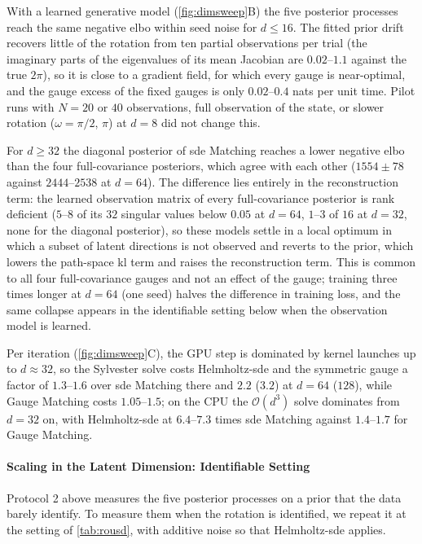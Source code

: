 \documentclass{article} %
\begin{document}
With a learned generative model (\cref{fig:dimsweep}B) the five posterior processes reach the same negative \gls{elbo} within seed noise for $d \le 16$. The fitted prior drift recovers little of the rotation from ten partial observations per trial (the imaginary parts of the eigenvalues of its mean Jacobian are $0.02$--$1.1$ against the true $2\pi$), so it is close to a gradient field, for which every gauge is near-optimal, and the gauge excess of the fixed gauges is only $0.02$--$0.4$ nats per unit time. Pilot runs with $N = 20$ or $40$ observations, full observation of the state, or slower rotation ($\omega = \pi/2$, $\pi$) at $d = 8$ did not change this.

For $d \ge 32$ the diagonal posterior of \gls{sde} Matching reaches a lower negative \gls{elbo} than the four full-covariance posteriors, which agree with each other ($1554 \pm 78$ against $2444$--$2538$ at $d = 64$). The difference lies entirely in the reconstruction term: the learned observation matrix of every full-covariance posterior is rank deficient ($5$--$8$ of its $32$ singular values below $0.05$ at $d = 64$, $1$--$3$ of $16$ at $d = 32$, none for the diagonal posterior), so these models settle in a local optimum in which a subset of latent directions is not observed and reverts to the prior, which lowers the path-space \gls{kl} term and raises the reconstruction term. This is common to all four full-covariance gauges and not an effect of the gauge; training three times longer at $d = 64$ (one seed) halves the difference in training loss, and the same collapse appears in the identifiable setting below when the observation model is learned.

Per iteration (\cref{fig:dimsweep}C), the GPU step is dominated by kernel launches up to $d \approx 32$, so the Sylvester solve costs Helmholtz-\gls{sde} and the symmetric gauge a factor of $1.3$--$1.6$ over \gls{sde} Matching there and $2.2$ ($3.2$) at $d = 64$ ($128$), while Gauge Matching costs $1.05$--$1.5$; on the CPU the $\mathcal{O}(d^3)$ solve dominates from $d = 32$ on, with Helmholtz-\gls{sde} at $6.4$--$7.3$ times \gls{sde} Matching against $1.4$--$1.7$ for Gauge Matching.

\paragraph{Scaling in the Latent Dimension: Identifiable Setting}
Protocol 2 above measures the five posterior processes on a prior that the data barely identify. To measure them when the rotation is identified, we repeat it at the setting of \cref{tab:rousd}, with additive noise so that Helmholtz-\gls{sde} applies.
\end{document}
